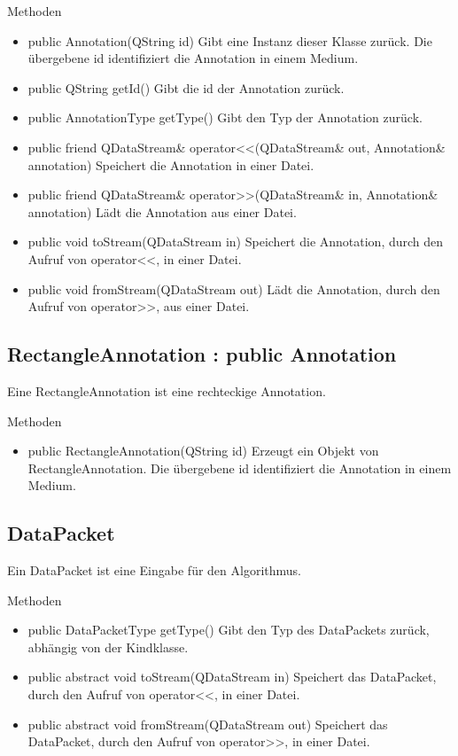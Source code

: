 Methoden
\begin{itemize}
\item public Annotation(QString id) Gibt eine Instanz dieser Klasse zurück. Die übergebene id identifiziert die Annotation in einem Medium.
\item public QString getId() Gibt die id der Annotation zurück.
\item public AnnotationType getType() Gibt den Typ der Annotation zurück.
\item public friend QDataStream\& operator<<(QDataStream\& out, Annotation\& annotation) Speichert die Annotation in einer Datei.
\item public friend QDataStream\& operator>>(QDataStream\& in, Annotation\& annotation) Lädt die Annotation aus einer Datei.
\item public void toStream(QDataStream in) Speichert die Annotation, durch den Aufruf von operator<<, in einer Datei.
\item public void fromStream(QDataStream out) Lädt die Annotation, durch den Aufruf von operator>>, aus einer Datei.
\end{itemize}

\subsection*{RectangleAnnotation : public Annotation}
Eine RectangleAnnotation ist eine rechteckige Annotation.

Methoden
\begin{itemize}
\item public RectangleAnnotation(QString id) Erzeugt ein Objekt von RectangleAnnotation. Die übergebene id identifiziert die Annotation in einem Medium.
\end{itemize}

\subsection*{DataPacket}
Ein DataPacket ist eine Eingabe für den Algorithmus.

Methoden
\begin{itemize}
\item public DataPacketType getType() Gibt den Typ des DataPackets zurück, abhängig von der Kindklasse.
\item public abstract void toStream(QDataStream in) Speichert das DataPacket, durch den Aufruf von operator<<, in einer Datei.
\item public abstract void fromStream(QDataStream out) Speichert das DataPacket, durch den Aufruf von operator>>, in einer Datei.
\end{itemize}

